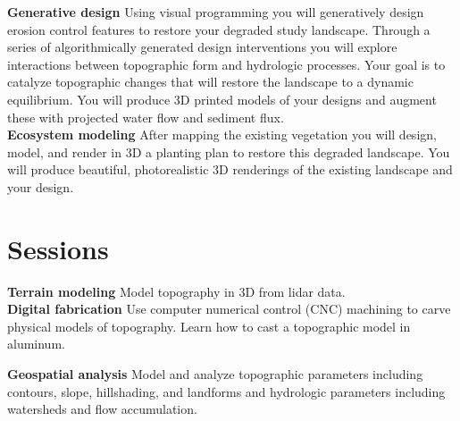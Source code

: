 \documentclass[11pt,article,oneside]{memoir}
\begin{document}

\noindent \textbf{Generative design}
Using visual programming you will generatively design
erosion control features to restore your degraded study landscape.
Through a series of algorithmically generated design interventions 
you will explore interactions between 
topographic form and hydrologic processes.
Your goal is to catalyze topographic changes that will 
restore the landscape to a dynamic equilibrium.  
You will produce 3D printed models of your designs
and augment these with projected water flow and sediment flux. \\

\noindent \textbf{Ecosystem modeling}
After mapping the existing vegetation 
you will design, model, and render in 3D
a planting plan to restore this degraded landscape. 
You will produce beautiful, photorealistic 3D renderings  
of the existing landscape and your design. \\


\section{Sessions}

\renewcommand*{\bibfont}{\footnotesize}

\noindent \textbf{Terrain modeling}
Model topography in 3D from lidar data.\\

\noindent \textbf{Digital fabrication}
Use computer numerical control (CNC) machining 
to carve physical models of topography. 
Learn how to cast a topographic model
in aluminum.
%
\nocite{*} \printbibliography[keyword=fabrication, heading=none]
\vspace*{0.5em}

\noindent \textbf{Geospatial analysis}
Model and analyze topographic parameters including 
contours, slope, hillshading, and landforms
and hydrologic parameters 
including watersheds and flow accumulation. \\

\end{document}
